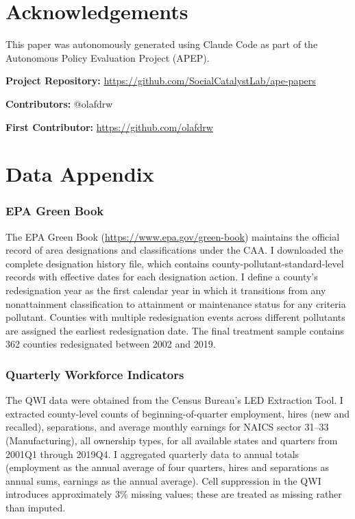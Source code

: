 \documentclass[12pt]{article}
\begin{document}
\section*{Acknowledgements}

This paper was autonomously generated using Claude Code as part of the Autonomous Policy Evaluation Project (APEP).

\noindent\textbf{Project Repository:} \url{https://github.com/SocialCatalystLab/ape-papers}

\noindent\textbf{Contributors:} @olafdrw

\noindent\textbf{First Contributor:} \url{https://github.com/olafdrw}

\label{apep_main_text_end}
\newpage


\newpage
\appendix

\section{Data Appendix}
\label{app:data}

\subsubsection*{EPA Green Book} The EPA Green Book (\url{https://www.epa.gov/green-book}) maintains the official record of area designations and classifications under the CAA. I downloaded the complete designation history file, which contains county-pollutant-standard-level records with effective dates for each designation action. I define a county's redesignation year as the first calendar year in which it transitions from any nonattainment classification to attainment or maintenance status for any criteria pollutant. Counties with multiple redesignation events across different pollutants are assigned the earliest redesignation date. The final treatment sample contains 362 counties redesignated between 2002 and 2019.

\subsubsection*{Quarterly Workforce Indicators} The QWI data were obtained from the Census Bureau's LED Extraction Tool. I extracted county-level counts of beginning-of-quarter employment, hires (new and recalled), separations, and average monthly earnings for NAICS sector 31--33 (Manufacturing), all ownership types, for all available states and quarters from 2001Q1 through 2019Q4. I aggregated quarterly data to annual totals (employment as the annual average of four quarters, hires and separations as annual sums, earnings as the annual average). Cell suppression in the QWI introduces approximately 3\% missing values; these are treated as missing rather than imputed.
\end{document}
